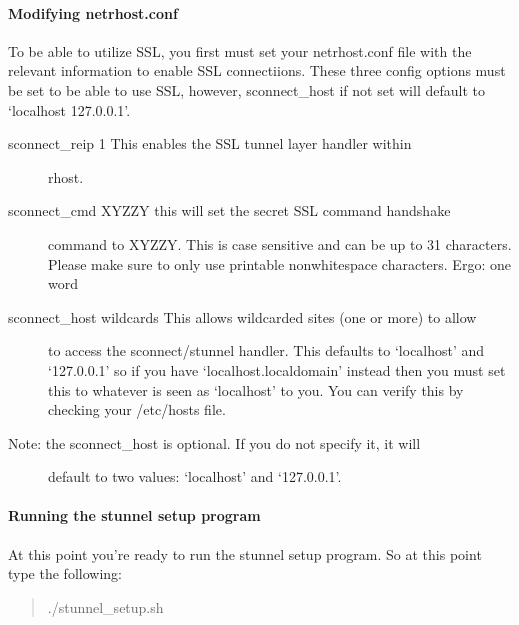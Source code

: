 \documentclass[letterpaper,10pt,english]{sphinxmanual}
\begin{document}
\paragraph{Modifying netrhost.conf}
\label{\detokenize{security:modifying-netrhost-conf}}
\sphinxAtStartPar
To be able to utilize SSL, you first must set your netrhost.conf file with
the relevant information to enable SSL connectiions.  These three config
options must be set to be able to use SSL, however, sconnect\_host if
not set will default to ‘localhost 127.0.0.1’.
\begin{description}
\item[{sconnect\_reip 1         \textendash{} This enables the SSL tunnel layer handler within}] \leavevmode
\sphinxAtStartPar
rhost.

\item[{sconnect\_cmd XYZZY      \textendash{} this will set the secret SSL command handshake}] \leavevmode
\sphinxAtStartPar
command to XYZZY.  This is case sensitive and can
be up to 31 characters.  Please make sure to only
use printable non\sphinxhyphen{}whitespace characters.
Ergo: one word

\item[{sconnect\_host wildcards \textendash{} This allows wildcarded sites (one or more) to allow}] \leavevmode
\sphinxAtStartPar
to access the sconnect/stunnel handler.  This
defaults to ‘localhost’ and ‘127.0.0.1’ so if you
have ‘localhost.localdomain’ instead then you must
set this to whatever is seen as ‘localhost’ to you.
You can verify this by checking your /etc/hosts
file.

\item[{Note: the sconnect\_host is optional.  If you do not specify it, it will}] \leavevmode
\sphinxAtStartPar
default to two values:  ‘localhost’ and ‘127.0.0.1’.

\end{description}


\paragraph{Running the stunnel setup program}
\label{\detokenize{security:running-the-stunnel-setup-program}}
\sphinxAtStartPar
At this point you’re ready to run the stunnel setup program.  So at this point
type the following:
\begin{quote}

\sphinxAtStartPar
./stunnel\_setup.sh
\end{quote}
\end{document}
